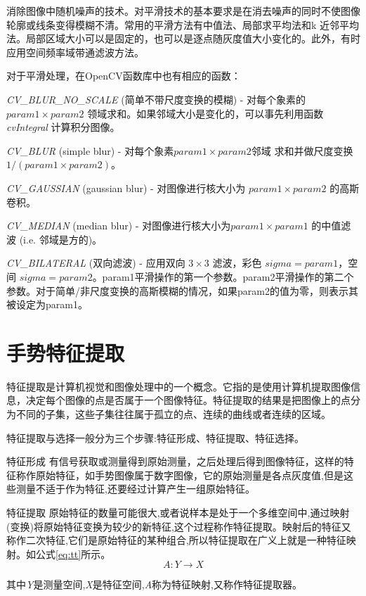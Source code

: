 \documentclass{XDBAthesis}
\begin{document}
消除图像中随机噪声的技术。对平滑技术的基本要求是在消去噪声的同时不使图像轮廓或线条变得模糊不清。常用的平滑方法有中值法、局部求平均法和k 近邻平均法。局部区域大小可以是固定的，也可以是逐点随灰度值大小变化的。此外，有时应用空间频率域带通滤波方法。

对于平滑处理，在OpenCV函数库中也有相应的函数：

\emph{CV\_BLUR\_NO\_SCALE} (简单不带尺度变换的模糊) - 对每个象素的 $param1\times param2$ 领域求和。如果邻域大小是变化的，可以事先利用函数 \emph{cvIntegral} 计算积分图像。

\emph{CV\_BLUR} (simple blur) - 对每个象素$param1\times param2$邻域 求和并做尺度变换 $1/(param1\times param2)$。

\emph{CV\_GAUSSIAN} (gaussian blur) - 对图像进行核大小为 $param1\times param2$ 的高斯卷积。

\emph{CV\_MEDIAN} (median blur) - 对图像进行核大小为$param1\times param1$ 的中值滤波 (i.e. 邻域是方的)。

\emph{CV\_BILATERAL} (双向滤波) - 应用双向 $3\times 3$ 滤波，彩色 $sigma=param1$，空间 $sigma=param2$。param1平滑操作的第一个参数。param2平滑操作的第二个参数。对于简单/非尺度变换的高斯模糊的情况，如果param2的值为零，则表示其被设定为param1。

\section{手势特征提取}

    特征提取是计算机视觉和图像处理中的一个概念。它指的是使用计算机提取图像信息，决定每个图像的点是否属于一个图像特征。特征提取的结果是把图像上的点分为不同的子集，这些子集往往属于孤立的点、连续的曲线或者连续的区域。

特征提取与选择一般分为三个步骤:特征形成、特征提取、特征选择。

特征形成  有信号获取或测量得到原始测量，之后处理后得到图像特征，这样的特征称作原始特征，如手势图像属于数字图像，它的原始测量是各点灰度值,但是这些测量不适于作为特征,还要经过计算产生一组原始特征。

     特征提取  原始特征的数量可能很大,或者说样本是处于一个多维空间中,通过映射(变换)将原始特征变换为较少的新特征,这个过程称作特征提取。映射后的特征又称作二次特征,它们是原始特征的某种组合,所以特征提取在广义上就是一种特征映射。如公式\eqref{eq:tt}所示。
\begin{equation}
    A:Y\rightarrow X
    \label{eq:tt}
\end{equation}

其中\emph{Y}是测量空间,\emph{X}是特征空间,\emph{A}称为特征映射,又称作特征提取器。
\end{document}
